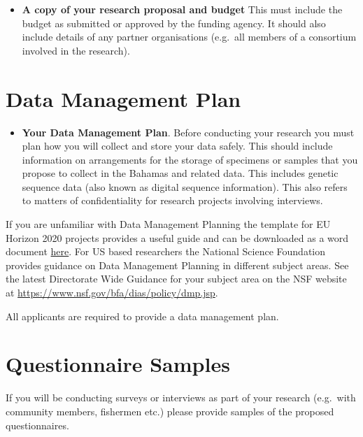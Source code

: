 \documentclass[
]{book}
\providecommand{\tightlist}{%
  \setlength{\itemsep}{0pt}\setlength{\parskip}{0pt}}
\begin{document}
\begin{itemize}
\tightlist
\item
  \textbf{A copy of your research proposal and budget} This must include the budget as submitted or approved by the funding agency. It should also include details of any partner organisations (e.g.~all members of a consortium involved in the research).
\end{itemize}

\hypertarget{data-management-plan}{%
\section{Data Management Plan}\label{data-management-plan}}

\begin{itemize}
\tightlist
\item
  \textbf{Your Data Management Plan}. Before conducting your research you must plan how you will collect and store your data safely. This should include information on arrangements for the storage of specimens or samples that you propose to collect in the Bahamas and related data. This includes genetic sequence data (also known as digital sequence information). This also refers to matters of confidentiality for research projects involving interviews.
\end{itemize}

If you are unfamiliar with Data Management Planning the template for EU Horizon 2020 projects provides a useful guide and can be downloaded as a word document \href{https://ec.europa.eu/research/participants/data/ref/h2020/gm/reporting/h2020-tpl-oa-data-mgt-plan_en.docx}{here}. For US based researchers the National Science Foundation provides guidance on Data Management Planning in different subject areas. See the latest Directorate Wide Guidance for your subject area on the NSF website at \url{https://www.nsf.gov/bfa/dias/policy/dmp.jsp}.

All applicants are required to provide a data management plan.

\hypertarget{questionnaire-samples}{%
\section{Questionnaire Samples}\label{questionnaire-samples}}

If you will be conducting surveys or interviews as part of your research (e.g.~with community members, fishermen etc.) please provide samples of the proposed questionnaires.
\end{document}
